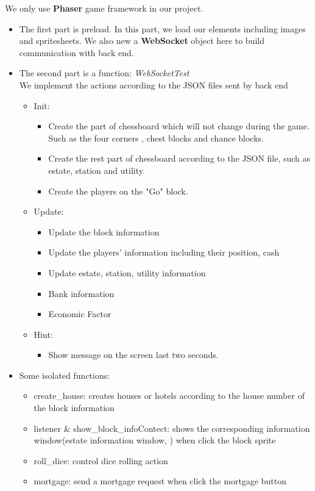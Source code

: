\documentclass[a4paper,11pt]{article}
\begin{document}
	We only use \textbf{Phaser} game framework in our project.
	\begin{itemize}
		\item The first part is preload. In this part, we load our elements including images and spritesheets. We also new a \textbf{WebSocket} object here to build communication with back end.
		\item The second part is a function: \emph{WebSocketTest}\\
		We implement the actions according to the JSON files sent by back end
		\begin{itemize}
			\item Init:
			\begin{itemize}
				\item Create the part of chessboard which will not change during the game. Such as the four corners , chest blocks and chance blocks.
				\item Create the rest part of chessboard according to the JSON file, such as estate, station and utility.
				\item Create the players on the "Go" block.
			\end{itemize}
		\item Update:
		\begin{itemize}
			\item Update the block information
			\item Update the players' information including their position, cash 
			\item Update estate, station, utility information
			\item Bank information
			\item Economic Factor
		\end{itemize}
	\item Hint:
	\begin{itemize}
		\item Show message on the screen last two seconds.
	\end{itemize}
		\end{itemize}
		\item  Some isolated functions:
		\begin{itemize}
			\item create\_house: creates houses or hotels according to the house number of the block information
			\item listener \& show\_block\_infoContect: shows the corresponding information window(estate information window, ) when click the block sprite
			\item roll\_dice: control dice rolling action
			\item mortgage: send a mortgage request when click the mortgage button
		\end{itemize}
	\end{itemize}
\end{document}

